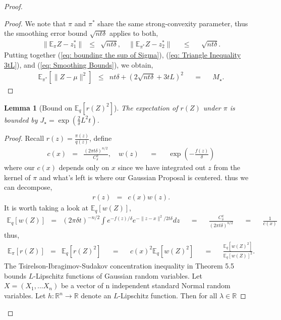\documentclass{article}
\newcommand{\Real}{\mathbb{R}}
\newcommand{\E}{\mathbb{E}}
\newcommand{\amp}{\mathop{\:\:\,}\nolimits}
\theoremstyle{plain}
\newtheorem{lemma}[theorem]{Lemma}
\theoremstyle{definition}
\theoremstyle{remark}
\begin{document}
\begin{proof}
\begin{proof}
We note that $\pi$ and $\pi^*$ share the same strong-convexity parameter, thus the smoothing error bound $\sqrt{nt\delta}$ applies to both,
\begin{eqnarray}
    \|\E_\pi Z- z_1^*\| &\leq& \sqrt{nt\delta}, \quad \|\E_{\pi^*} Z- z_2^*\| \amp\leq\amp \sqrt{nt\delta}. \label{eq: Smoothing Bounds}
\end{eqnarray}
Putting together (\ref{eq: bounding the sup of Sigma}), (\ref{eq: Triangle Inequality 3tL}), and (\ref{eq: Smoothing Bounds}), 
we obtain, 
\begin{eqnarray}
    \E_{\pi^*}[\|Z-\mu\|^2] &\leq& nt\delta + (2\sqrt{nt\delta} + 3tL)^2 \amp=\amp M_\star.
\end{eqnarray}
\end{proof}
\begin{lemma}[Bound on {$\E_q[r(Z)^2]$}]\label{lem: J Bound}
    The expectation of $r(Z)$ under $\pi$ is bounded by $J_\star = \exp(\frac{2}{\delta}L^2t)$.
\end{lemma}
\begin{proof}
    Recall $r(z) = \frac{\pi(z)}{q(z)}$, define 
\begin{eqnarray}
    c(x) &=& \frac{(2\pi t\delta)^{n/2}}{C^x_\delta}, \quad w(z) \amp=\amp \exp\left(-\frac{f(z)}{\delta}\right)
\end{eqnarray}
where our $c(x)$ depends only on $x$ since we have integrated out $z$ from the kernel of $\pi$ and what's left is where our Gaussian Proposal is centered. thus we can decompose, 
\begin{eqnarray}
    r(z) &=& c(x)w(z).
\end{eqnarray}
It is worth taking a look at $\E_q[w(Z)]$, 
\begin{eqnarray}
    \E_q[w(Z)]&=&  (2\pi \delta t )^{-n/2} \int e^{-f(z)/ \delta} e^{-\|z-x\|^2/2t\delta}dz \amp=\amp \frac{C_\delta^x}{(2\pi t \delta )^{n/2}} \amp=\amp \frac{1}{c(x)}
\end{eqnarray}
thus, 
\begin{eqnarray}
    \E_\pi[r(Z)] &=& \E_q[r(Z)^2] \amp=\amp c(x)^2\E_q[w(Z)^2] \amp=\amp \frac{\E_q[w(Z)^2]}{\E_q[w(Z)]^2}. \label{eq: Weights Ratio}
\end{eqnarray}
The Tsirelson-Ibragimov-Sudakov concentration inequality in Theorem 5.5 \cite{BoucheronLugosiMassart2016} bounds $L$-Lipschitz functions of Gaussian random variables. Let $X = (X_1,...X_n)$ be a vector of n independent standard Normal random variables. Let $h: \Real^n \rightarrow \Real$ denote an $L$-Lipschitz function. Then for all $\lambda \in \Real$

\end{proof}
\end{proof}
\end{document}
